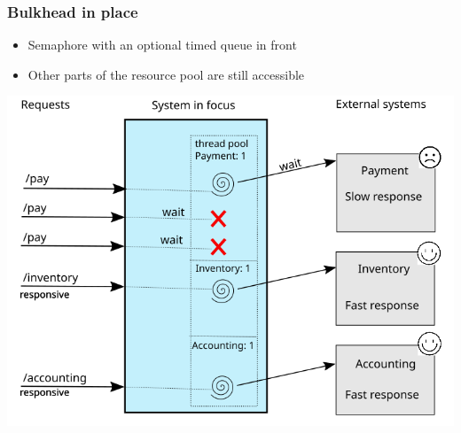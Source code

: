 \documentclass[8pt]{article}
\begin{document}
\subsubsection{Bulkhead in place}
\label{sec:org5d0ba1f}
\begin{itemize}
\item Semaphore with an optional timed queue in front
\item Other parts of the resource pool are still accessible
\end{itemize}

\begin{center}
\includegraphics[width=.9\linewidth]{graphics/svg/with_bulkhead.png}
\end{center}
\end{document}
